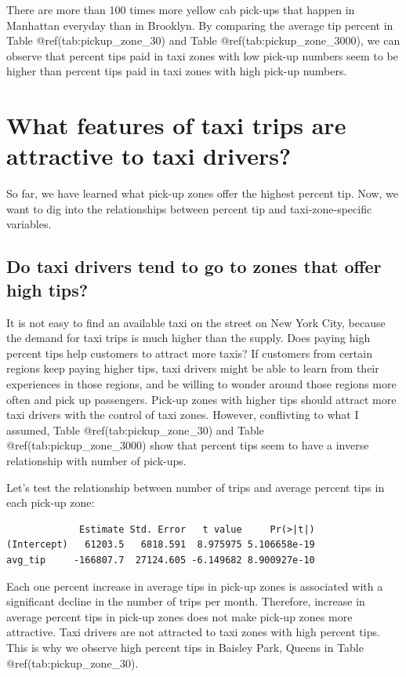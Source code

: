 \documentclass[12pt,twoside]{reedthesis}
\theoremstyle{definition}
\theoremstyle{definition}
\theoremstyle{definition}
\theoremstyle{remark}
\begin{document}
There are more than 100 times more yellow cab pick-ups that happen in
Manhattan everyday than in Brooklyn. By comparing the average tip
percent in Table @ref(tab:pickup\_zone\_30) and Table
@ref(tab:pickup\_zone\_3000), we can observe that percent tips paid in
taxi zones with low pick-up numbers seem to be higher than percent tips
paid in taxi zones with high pick-up numbers.

\section{What features of taxi trips are attractive to taxi
drivers?}\label{what-features-of-taxi-trips-are-attractive-to-taxi-drivers}

So far, we have learned what pick-up zones offer the highest percent
tip. Now, we want to dig into the relationships between percent tip and
taxi-zone-specific variables.

\subsection{Do taxi drivers tend to go to zones that offer high
tips?}\label{do-taxi-drivers-tend-to-go-to-zones-that-offer-high-tips}

It is not easy to find an available taxi on the street on New York City,
because the demand for taxi trips is much higher than the supply. Does
paying high percent tips help customers to attract more taxis? If
customers from certain regions keep paying higher tips, taxi drivers
might be able to learn from their experiences in those regions, and be
willing to wonder around those regions more often and pick up
passengers. Pick-up zones with higher tips should attract more taxi
drivers with the control of taxi zones. However, conflivting to what I
assumed, Table @ref(tab:pickup\_zone\_30) and Table
@ref(tab:pickup\_zone\_3000) show that percent tips seem to have a
inverse relationship with number of pick-ups.

Let's test the relationship between number of trips and average percent
tips in each pick-up zone:
\begin{verbatim}
             Estimate Std. Error   t value     Pr(>|t|)
(Intercept)   61203.5   6818.591  8.975975 5.106658e-19
avg_tip     -166807.7  27124.605 -6.149682 8.900927e-10
\end{verbatim}
Each one percent increase in average tips in pick-up zones is associated
with a significant decline in the number of trips per month. Therefore,
increase in average percent tips in pick-up zones does not make pick-up
zones more attractive. Taxi drivers are not attracted to taxi zones with
high percent tips. This is why we observe high percent tips in Baisley
Park, Queens in Table @ref(tab:pickup\_zone\_30).
\end{document}
